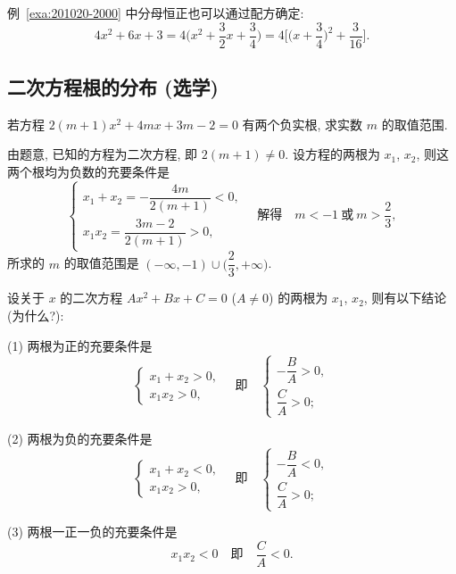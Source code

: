 例~\ref{exa:201020-2000} 中分母恒正也可以通过配方确定:
\[4x^2+6x+3= 4\biggl(x^2+\frac32x+\frac34\biggr)
  = 4\biggl[\biggl(x+\frac34\biggr)^2+\frac3{16}\biggr].\]

\subsection{二次方程根的分布 (选学)}
\begin{example}
  若方程 $2(m+1)x^2+4mx+3m-2=0$ 有两个负实根, 求实数 $m$ 的取值范围.
\end{example}
\begin{solution}
  由题意, 已知的方程为二次方程, 即 $2(m+1)\neq 0$. 设方程的两根为 $x_1$, $x_2$, 则这两个根均为负数的充要条件是
  \[\left\{\!\!\begin{array}{l}
      x_1+x_2=-\dfrac{4m}{2(m+1)}<0,\\
      x_1x_2=\dfrac{3m-2}{2(m+1)}>0,
    \end{array}\right.\quad\text{解得}\quad
    m<-1\ \text{或}\ m>\frac23,\]
  所求的 $m$ 的取值范围是 $(-\infty,-1)\cup\biggl(\dfrac23,+\infty\biggr)$.
\end{solution}

设关于 $x$ 的二次方程 $Ax^2+Bx+C=0$ ($A\neq0$) 的两根为 $x_1$, $x_2$, 则有以下结论 (为什么?):

(1) 两根为正的充要条件是
  \[\left\{\!\!\begin{array}{l}
      x_1+x_2>0,\\
      x_1x_2>0,
    \end{array}\right.\quad\text{即}\quad
    \left\{\!\!\begin{array}{l}
      -\dfrac{B}A>0,\\
      \dfrac{C}A>0;
    \end{array}\right.\]

(2) 两根为负的充要条件是
  \[\left\{\!\!\begin{array}{l}
      x_1+x_2<0,\\
      x_1x_2>0,
    \end{array}\right.\quad\text{即}\quad
    \left\{\!\!\begin{array}{l}
      -\dfrac{B}A<0,\\
      \dfrac{C}A>0;
    \end{array}\right.\]
    
(3) 两根一正一负的充要条件是
  \[x_1x_2<0\quad\text{即}\quad\frac{C}A<0.\]

\endinput